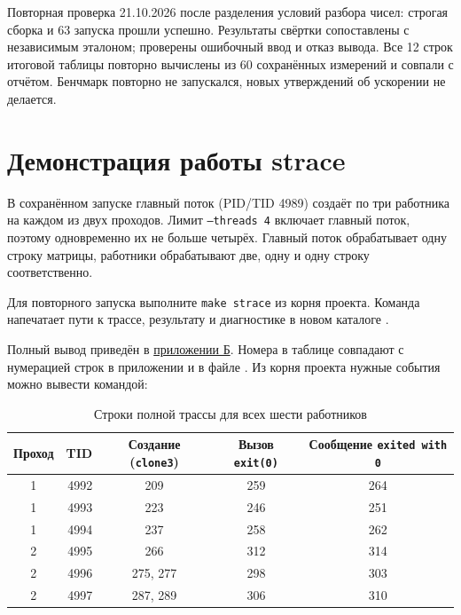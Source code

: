 \documentclass[12pt,a4paper]{article}
\begin{document}
Повторная проверка 21.10.2026 после разделения условий разбора чисел: строгая сборка и 63 запуска прошли успешно. Результаты свёртки сопоставлены с независимым эталоном; проверены ошибочный ввод и отказ вывода. Все 12 строк итоговой таблицы повторно вычислены из 60 сохранённых измерений и совпали с отчётом. Бенчмарк повторно не запускался, новых утверждений об ускорении не делается.

\section{Демонстрация работы strace}

В сохранённом запуске главный поток (PID/TID 4989) создаёт по три работника на каждом из двух проходов. Лимит \texttt{--threads 4} включает главный поток, поэтому одновременно их не больше четырёх. Главный поток обрабатывает одну строку матрицы, работники обрабатывают две, одну и одну строку соответственно.

Для повторного запуска выполните \texttt{make strace} из корня проекта. Команда напечатает пути к трассе, результату и диагностике в новом каталоге .

Полный вывод приведён в \hyperref[app:full-strace]{приложении Б}. Номера в таблице совпадают с нумерацией строк в приложении и в файле . Из корня проекта нужные события можно вывести командой:


\begin{table}[H]
\caption{Строки полной трассы для всех шести работников}
\centering\small
\begin{tabular}{|c|r|c|c|c|}\hline
Проход & TID & Создание (\texttt{clone3}) & Вызов \texttt{exit(0)} & Сообщение \texttt{exited with 0} \\ \hline
1 & 4992 & 209 & 259 & 264 \\ \hline
1 & 4993 & 223 & 246 & 251 \\ \hline
1 & 4994 & 237 & 258 & 262 \\ \hline
2 & 4995 & 266 & 312 & 314 \\ \hline
2 & 4996 & 275, 277 & 298 & 303 \\ \hline
2 & 4997 & 287, 289 & 306 & 310 \\ \hline
\end{tabular}
\end{table}
\end{document}
